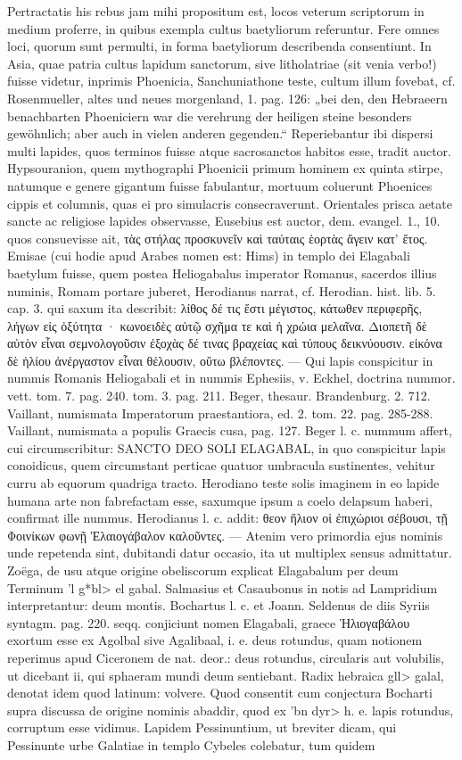 \documentclass[a4paper, 11pt, oneside, polutonikogreek, german]{article}
\begin{document}
Pertractatis his rebus jam mihi propositum est, locos veterum scriptorum in medium proferre, in quibus exempla cultus baetyliorum referuntur. Fere omnes loci, quorum sunt permulti, in forma baetyliorum describenda consentiunt. In Asia, quae patria cultus lapidum sanctorum, sive litholatriae (sit venia verbo!) fuisse videtur, inprimis Phoenicia, Sanchuniathone teste, cultum illum fovebat, cf. Rosenmueller, altes und neues morgenland, 1. pag. 126: „bei den, den Hebraeern benachbarten Phoeniciern war die verehrung der heiligen steine besonders gewöhnlich; aber auch in vielen anderen gegenden.“ Reperiebantur ibi dispersi multi lapides, quos terminos fuisse atque sacrosanctos habitos esse, tradit auctor. Hypsouranion, quem mythographi Phoenicii primum hominem ex quinta stirpe, natumque e genere gigantum fuisse fabulantur, mortuum coluerunt Phoenices cippis et columnis, quas ei pro simulacris consecraverunt. Orientales prisca aetate sancte ac religiose lapides observasse, Eusebius est auctor, dem. evangel. 1., 10. quos consuevisse ait, τὰς στήλας προσκυνεῖν καὶ ταύταις ἑορτὰς ἄγειν κατ' ἔτος. Emisae (cui hodie apud Arabes nomen est: Hims) in templo dei Elagabali baetylum fuisse, quem postea Heliogabalus imperator Romanus, sacerdos illius numinis, Romam portare juberet, Herodianus narrat, cf. Herodian. hist. lib. 5. cap. 3. qui saxum ita describit: λίθος δέ τις ἔστι μέγιστος, κάτωθεν περιφερῆς, λήγων εἰς ὀξύτητα · κωνοειδὲς αὐτῷ σχῆμα τε καὶ ἡ χρώια μελαῖνα. Διοπετῆ δὲ αὐτὸν εἶναι σεμνολογοῦσιν ἐξοχὰς δέ τινας βραχείας καὶ τύπους δεικνύουσιν. εἰκόνα δὲ ἡλίου ἀνέργαστον εἶναι θέλουσιν, οὕτω βλέποντες. --- Qui lapis conspicitur in nummis Romanis Heliogabali et in nummis Ephesiis, v. Eckhel, doctrina nummor. vett. tom. 7. pag. 240. tom. 3. pag. 211. Beger, thesaur. Brandenburg. 2. 712. Vaillant, numismata Imperatorum praestantiora, ed. 2. tom. 22. pag. 285-288. Vaillant, numismata a populis Graecis cusa, pag. 127. Beger l. c. nummum affert, cui circumscribitur: SANCTO DEO SOLI ELAGABAL, in quo conspicitur lapis conoidicus, quem circumstant perticae quatuor umbracula sustinentes, vehitur curru ab equorum quadriga tracto. Herodiano teste solis imaginem in eo lapide humana arte non fabrefactam esse, saxumque ipsum a coelo delapsum haberi, confirmat ille nummus. Herodianus l. c. addit: θεον ἥλιον οἱ ἐπιχώριοι σέβουσι, τῇ Φοινίκων φωνῇ Ἐλαιογάβαλον καλοῦντες. --- Atenim vero primordia ejus nominis unde repetenda sint, dubitandi datur occasio, ita ut multiplex sensus admittatur. Zoëga, de usu atque origine obeliscorum explicat Elagabalum per deum Terminum \<'l g*bl> el gabal. Salmasius et Casaubonus in notis ad Lampridium interpretantur: deum montis. Bochartus l. c. et Joann. Seldenus de diis Syriis syntagm. pag. 220. seqq. conjiciunt nomen Elagabali, graece Ἡλιογαβάλου exortum esse ex Agolbal sive Agalibaal, i. e. deus rotundus, quam notionem reperimus apud Ciceronem de nat. deor.: deus rotundus, circularis aut volubilis, ut dicebant ii, qui sphaeram mundi deum sentiebant. Radix hebraica \<gll> galal, denotat idem quod latinum: volvere. Quod consentit cum conjectura Bocharti supra discussa de origine nominis abaddir, quod ex \<'bn dyr> h. e. lapis rotundus, corruptum esse vidimus. Lapidem Pessinuntium, ut breviter dicam, qui Pessinunte urbe Galatiae in templo Cybeles colebatur, tum quidem 
\end{document}
